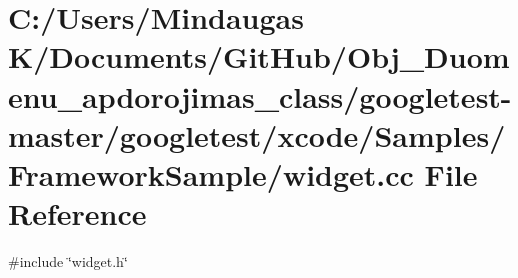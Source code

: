 \hypertarget{googletest-master_2googletest_2xcode_2_samples_2_framework_sample_2widget_8cc}{}\section{C\+:/\+Users/\+Mindaugas K/\+Documents/\+Git\+Hub/\+Obj\+\_\+\+Duomenu\+\_\+apdorojimas\+\_\+class/googletest-\/master/googletest/xcode/\+Samples/\+Framework\+Sample/widget.cc File Reference}
\label{googletest-master_2googletest_2xcode_2_samples_2_framework_sample_2widget_8cc}
{\ttfamily \#include \char`\"{}widget.\+h\char`\"{}}\newline

